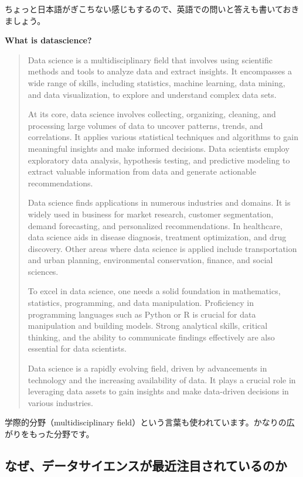 \documentclass[
  xelatex, ja=standard]{bxjsbook}
\theoremstyle{definition}
\theoremstyle{definition}
\theoremstyle{definition}
\theoremstyle{definition}
\theoremstyle{remark}
\begin{document}
ちょっと日本語がぎこちない感じもするので、英語での問いと答えも書いておきましょう。

\textbf{What is datascience?}

\begin{quote}
Data science is a multidisciplinary field that involves using scientific methods and tools to analyze data and extract insights. It encompasses a wide range of skills, including statistics, machine learning, data mining, and data visualization, to explore and understand complex data sets.

At its core, data science involves collecting, organizing, cleaning, and processing large volumes of data to uncover patterns, trends, and correlations. It applies various statistical techniques and algorithms to gain meaningful insights and make informed decisions. Data scientists employ exploratory data analysis, hypothesis testing, and predictive modeling to extract valuable information from data and generate actionable recommendations.

Data science finds applications in numerous industries and domains. It is widely used in business for market research, customer segmentation, demand forecasting, and personalized recommendations. In healthcare, data science aids in disease diagnosis, treatment optimization, and drug discovery. Other areas where data science is applied include transportation and urban planning, environmental conservation, finance, and social sciences.

To excel in data science, one needs a solid foundation in mathematics, statistics, programming, and data manipulation. Proficiency in programming languages such as Python or R is crucial for data manipulation and building models. Strong analytical skills, critical thinking, and the ability to communicate findings effectively are also essential for data scientists.

Data science is a rapidly evolving field, driven by advancements in technology and the increasing availability of data. It plays a crucial role in leveraging data assets to gain insights and make data-driven decisions in various industries.
\end{quote}

学際的分野（multidisciplinary field）という言葉も使われています。かなりの広がりをもった分野です。

\hypertarget{ux306aux305cux30c7ux30fcux30bfux30b5ux30a4ux30a8ux30f3ux30b9ux304cux6700ux8fd1ux6ce8ux76eeux3055ux308cux3066ux3044ux308bux306eux304b}{%
\subsection{なぜ、データサイエンスが最近注目されているのか}\label{ux306aux305cux30c7ux30fcux30bfux30b5ux30a4ux30a8ux30f3ux30b9ux304cux6700ux8fd1ux6ce8ux76eeux3055ux308cux3066ux3044ux308bux306eux304b}}
\end{document}
